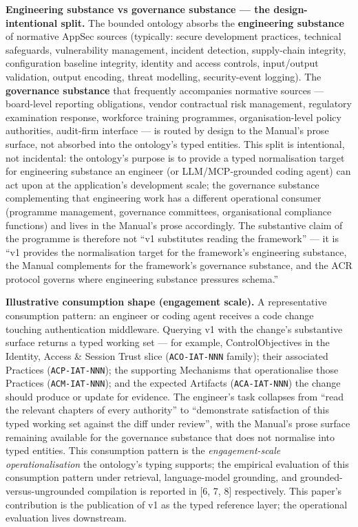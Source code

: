 \documentclass[
]{article}
\begin{document}
\textbf{Engineering substance vs governance substance --- the
design-intentional split.} The bounded ontology absorbs the
\textbf{engineering substance} of normative AppSec sources (typically:
secure development practices, technical safeguards, vulnerability
management, incident detection, supply-chain integrity, configuration
baseline integrity, identity and access controls, input/output
validation, output encoding, threat modelling, security-event logging).
The \textbf{governance substance} that frequently accompanies normative
sources --- board-level reporting obligations, vendor contractual risk
management, regulatory examination response, workforce training
programmes, organisation-level policy authorities, audit-firm interface
--- is routed by design to the Manual's prose surface, not absorbed into
the ontology's typed entities. This split is intentional, not
incidental: the ontology's purpose is to provide a typed normalisation
target for engineering substance an engineer (or LLM/MCP-grounded coding
agent) can act upon at the application's development scale; the
governance substance complementing that engineering work has a different
operational consumer (programme management, governance committees,
organisational compliance functions) and lives in the Manual's prose
accordingly. The substantive claim of the programme is therefore not
``v1 substitutes reading the framework'' --- it is ``v1 provides the
normalisation target for the framework's engineering substance, the
Manual complements for the framework's governance substance, and the ACR
protocol governs where engineering substance pressures schema.''

\textbf{Illustrative consumption shape (engagement scale).} A
representative consumption pattern: an engineer or coding agent receives
a code change touching authentication middleware. Querying v1 with the
change's substantive surface returns a typed working set --- for
example, ControlObjectives in the Identity, Access \& Session Trust
slice (\texttt{ACO-IAT-NNN} family); their associated Practices
(\texttt{ACP-IAT-NNN}); the supporting Mechanisms that operationalise
those Practices (\texttt{ACM-IAT-NNN}); and the expected Artifacts
(\texttt{ACA-IAT-NNN}) the change should produce or update for evidence.
The engineer's task collapses from ``read the relevant chapters of every
authority'' to ``demonstrate satisfaction of this typed working set
against the diff under review'', with the Manual's prose surface
remaining available for the governance substance that does not normalise
into typed entities. This consumption pattern is the
\emph{engagement-scale operationalisation} the ontology's typing
supports; the empirical evaluation of this consumption pattern under
retrieval, language-model grounding, and grounded-versus-ungrounded
compilation is reported in {[}6, 7, 8{]} respectively. This paper's
contribution is the publication of v1 as the typed reference layer; the
operational evaluation lives downstream.
\end{document}
